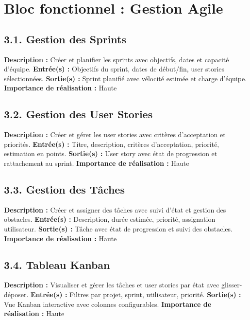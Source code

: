 \section{Bloc fonctionnel : Gestion Agile}

\subsection{3.1. Gestion des Sprints}
\textbf{Description :} Créer et planifier les sprints avec objectifs, dates et capacité d'équipe.
\textbf{Entrée(s) :} Objectifs du sprint, dates de début/fin, user stories sélectionnées.
\textbf{Sortie(s) :} Sprint planifié avec vélocité estimée et charge d'équipe.
\textbf{Importance de réalisation :} Haute

\subsection{3.2. Gestion des User Stories}
\textbf{Description :} Créer et gérer les user stories avec critères d'acceptation et priorités.
\textbf{Entrée(s) :} Titre, description, critères d'acceptation, priorité, estimation en points.
\textbf{Sortie(s) :} User story avec état de progression et rattachement au sprint.
\textbf{Importance de réalisation :} Haute

\subsection{3.3. Gestion des Tâches}
\textbf{Description :} Créer et assigner des tâches avec suivi d'état et gestion des obstacles.
\textbf{Entrée(s) :} Description, durée estimée, priorité, assignation utilisateur.
\textbf{Sortie(s) :} Tâche avec état de progression et suivi des obstacles.
\textbf{Importance de réalisation :} Haute

\subsection{3.4. Tableau Kanban}
\textbf{Description :} Visualiser et gérer les tâches et user stories par état avec glisser-déposer.
\textbf{Entrée(s) :} Filtres par projet, sprint, utilisateur, priorité.
\textbf{Sortie(s) :} Vue Kanban interactive avec colonnes configurables.
\textbf{Importance de réalisation :} Haute

